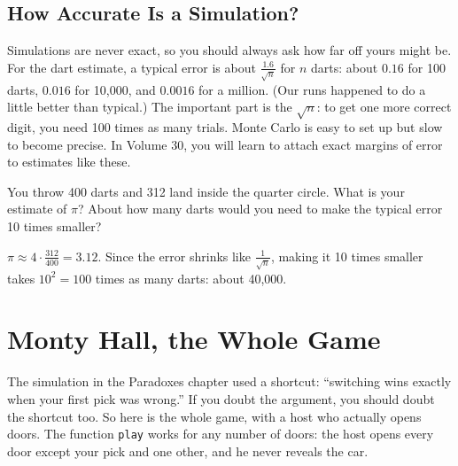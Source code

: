 \subsection{How Accurate Is a Simulation?}
Simulations are never exact, so you should always ask how far off yours might be. For
the dart estimate, a typical error is about $\frac{1.6}{\sqrt{n}}$ for $n$ darts:
about $0.16$ for 100 darts, $0.016$ for 10,000, and $0.0016$ for a million. (Our runs
happened to do a little better than typical.) The important part is the
$\sqrt{n}$: to get one more correct digit, you need 100 times as many trials. Monte Carlo
is easy to set up but slow to become precise. In Volume 30, you will learn to attach
exact margins of error to estimates like these.

\begin{Exercise}[title={Darts by Hand}, label=mc_darts]
You throw 400 darts and 312 land inside the quarter circle. What is your estimate of
$\pi$? About how many darts would you need to make the typical error 10 times smaller?
\end{Exercise}
\begin{Answer}[ref=mc_darts]
$\pi \approx 4 \cdot \frac{312}{400} = 3.12$. Since the error shrinks like $\frac{1}{\sqrt{n}}$,
making it 10 times smaller takes $10^2 = 100$ times as many darts: about 40,000.
\end{Answer}

\section{Monty Hall, the Whole Game}
The simulation in the Paradoxes chapter used a shortcut: ``switching wins exactly when
your first pick was wrong.'' If you doubt the argument, you should doubt the shortcut
too. So here is the whole game, with a host who actually opens doors. The function
\texttt{play} works for any number of doors: the host opens every door
except your pick and one other, and he never reveals the car.

